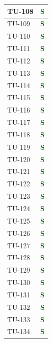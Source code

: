 \begin{longtable}{|C{2.5cm}|C{2.5cm}|}
	\hline
	{TU-108} & \textcolor{darkgreen}{\textbf{S}}\\
	\hline
	{TU-109} & \textcolor{darkgreen}{\textbf{S}}\\
	\hline
	{TU-110} & \textcolor{darkgreen}{\textbf{S}}\\
	\hline
	{TU-111} & \textcolor{darkgreen}{\textbf{S}}\\
	\hline
	{TU-112} & \textcolor{darkgreen}{\textbf{S}}\\
	\hline
	{TU-113} & \textcolor{darkgreen}{\textbf{S}}\\
	\hline
	{TU-114} & \textcolor{darkgreen}{\textbf{S}}\\
	\hline
	{TU-115} & \textcolor{darkgreen}{\textbf{S}}\\
	\hline
	{TU-116} & \textcolor{darkgreen}{\textbf{S}}\\
	\hline
	{TU-117} & \textcolor{darkgreen}{\textbf{S}}\\
	\hline
	{TU-118} & \textcolor{darkgreen}{\textbf{S}}\\
	\hline
	{TU-119} & \textcolor{darkgreen}{\textbf{S}}\\
	\hline
	{TU-120} & \textcolor{darkgreen}{\textbf{S}}\\
	\hline
	{TU-121} & \textcolor{darkgreen}{\textbf{S}}\\
	\hline
	{TU-122} & \textcolor{darkgreen}{\textbf{S}}\\
	\hline
	{TU-123} & \textcolor{darkgreen}{\textbf{S}}\\
	\hline
	{TU-124} & \textcolor{darkgreen}{\textbf{S}}\\
	\hline
	{TU-125} & \textcolor{darkgreen}{\textbf{S}}\\
	\hline
	{TU-126} & \textcolor{darkgreen}{\textbf{S}}\\
	\hline
	{TU-127} & \textcolor{darkgreen}{\textbf{S}}\\
	\hline
	{TU-128} & \textcolor{darkgreen}{\textbf{S}}\\
	\hline
	{TU-129} & \textcolor{darkgreen}{\textbf{S}}\\
	\hline
	{TU-130} & \textcolor{darkgreen}{\textbf{S}}\\
	\hline
	{TU-131} & \textcolor{darkgreen}{\textbf{S}}\\
	\hline
	{TU-132} & \textcolor{darkgreen}{\textbf{S}}\\
	\hline
	{TU-133} & \textcolor{darkgreen}{\textbf{S}}\\
	\hline
	{TU-134} & \textcolor{darkgreen}{\textbf{S}}\\
	\hline

\end{longtable}

